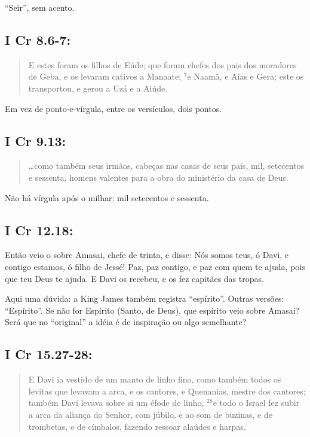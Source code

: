 ``Seir'', sem acento.

\subsection{I Cr 8.6-7:}
\begin{quote}
    \small
E estes foram os filhos de Eúde; que foram chefes dos pais dos moradores de Geba, e os levaram cativos a Manaate\uline{;} $^{\mathrm{7}}$e Naamã, e Aías e Gera; este os transportou, e gerou a Uzá e a Aiúde.
\end{quote}

Em vez de ponto-e-vírgula, entre os versículos, dois pontos.

\subsection{I Cr 9.13:}
\begin{quote}
    \small
\ldots como também seus irmãos, cabeças nas casas de seus pais, mil\uline{,} setecentos e sessenta, homens valentes para a obra do ministério da casa de Deus.
\end{quote}

Não há vírgula após o milhar: mil setecentos e sessenta.

\subsection{I Cr 12.18:} Então veio o  sobre Amasai, chefe de trinta, e disse: Nós somos teus, ó Davi, e contigo estamos, ó filho de Jessé! Paz, paz contigo, e paz com quem te ajuda, pois que teu Deus te ajuda. E Davi os recebeu, e os fez capitães das tropas.

Aqui uma dúvida: a King James também registra ``espírito''. Outras
versões: ``Espírito''. Se não for Espírito (Santo, de Deus), que
espírito veio sobre Amasai? Será que no ``original'' a idéia é de
inspiração ou algo semelhante?

\subsection{I Cr 15.27-28:}
\begin{quote}
    \small
E Davi ia vestido de um manto de linho fino, como também todos os levitas que levavam a arca, e os cantores, e Quenanias, mestre dos cantores; também Davi levava sobre si um éfode de linho\uline{,} $^{\mathrm{28}}$e todo o Israel fez subir a arca da aliança do Senhor, com júbilo, e ao som de buzinas, e de trombetas, e de címbalos, fazendo ressoar alaúdes e harpas.
\end{quote}

